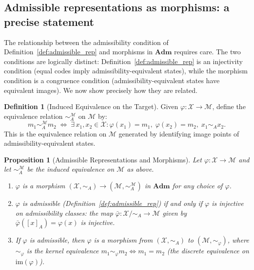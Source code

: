 \documentclass[11pt, a4paper]{article}
\theoremstyle{plain}
\newtheorem{proposition}[theorem]{Proposition}
\theoremstyle{definition}
\newtheorem{definition}[theorem]{Definition}
\theoremstyle{remark}
\newcommand{\calX}{\mathcal{X}}
\newcommand{\calM}{\mathcal{M}}
\newcommand{\simA}{\sim_{\!A}}
\newcommand{\XmodA}{\calX/{\simA}}
\newcommand{\Adm}{\mathbf{Adm}}
\newcommand{\im}{\mathrm{im}}
\begin{document}
\subsection{Admissible representations as morphisms: a precise statement}

The relationship between the admissibility condition of
Definition~\ref{def:admissible_rep} and morphisms in $\Adm$ requires care.
The two conditions are logically distinct: Definition~\ref{def:admissible_rep}
is an injectivity condition (equal codes imply admissibility-equivalent states),
while the morphism condition is a congruence condition (admissibility-equivalent
states have equivalent images). We now show precisely how they are related.

\begin{definition}[Induced Equivalence on the Target]
\label{def:induced_eq}
Given $\varphi\colon \calX \to \calM$, define the equivalence relation
$\simA^\calM$ on $\calM$ by:
\[
  m_1 \simA^\calM m_2 \;\iff\;
  \exists\, x_1, x_2 \in \calX\colon
  \varphi(x_1) = m_1,\; \varphi(x_2) = m_2,\; x_1 \simA x_2.
\]
This is the equivalence relation on $\calM$ generated by identifying image
points of admissibility-equivalent states.
\end{definition}

\begin{proposition}[Admissible Representations and Morphisms]
\label{prop:morph}
Let $\varphi\colon \calX \to \calM$ and let $\simA^\calM$ be the induced
equivalence on $\calM$ as above.

\begin{enumerate}[label=(\roman*),noitemsep]
  \item $\varphi$ is a morphism $(\calX, \simA) \to (\calM, \simA^\calM)$
    in $\Adm$ for any choice of $\varphi$.
  \item $\varphi$ is admissible (Definition~\ref{def:admissible_rep}) if and
    only if $\varphi$ is injective on admissibility classes: the map
    $\bar\varphi\colon \XmodA \to \calM$ given by $\bar\varphi([x]_A) =
    \varphi(x)$ is injective.
  \item If $\varphi$ is admissible, then $\varphi$ is a morphism from
    $(\calX, \simA)$ to $(\calM, \sim_\varphi)$, where $\sim_\varphi$ is
    the kernel equivalence $m_1 \sim_\varphi m_2 \iff m_1 = m_2$
    (the discrete equivalence on $\im(\varphi)$).
\end{enumerate}
\end{proposition}
\end{document}
